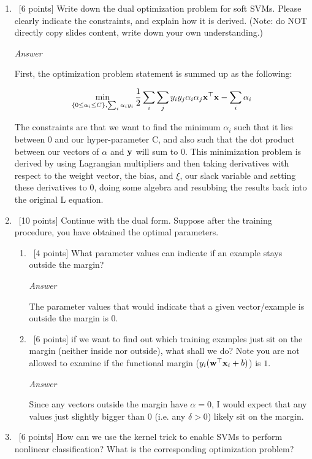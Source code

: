 \documentclass[12pt, fullpage,letterpaper]{article}
\begin{document}
\begin{enumerate}
	
	\item~[6 points] Write down the dual optimization problem for soft SVMs.  
	Please clearly indicate the constraints, and explain how it is derived. (Note: do NOT directly copy slides content, write down your own understanding.)
	
	\emph{Answer}
	
	First, the optimization problem statement is summed up as the following:
	
	\[
	    \min_{\{0 \leq \alpha_i \leq C\}, \sum_i \alpha_i y_i} \frac{1}{2} \sum_i \sum_j y_i y_j \alpha_i \alpha_j {\bf x}^\top {\bf x} - \sum_i \alpha_i
	\]
	
	The constraints are that we want to find the minimum $\alpha_i$ such that it lies between 0 and our hyper-parameter C, and also such that the dot product between our vectors of $\alpha$ and ${\bf y}$ will sum to $0$. This minimization problem is derived by using Lagrangian multipliers and then taking derivatives with respect to the weight vector, the bias, and $\xi$, our slack variable and setting these derivatives to 0, doing some algebra and resubbing the results back into the original L equation.
	
	\item~[10 points] Continue with the dual form. Suppose after the training procedure, you have obtained the optimal parameters.
	\begin{enumerate}
		\item~[4 points] What parameter values can indicate if an example stays outside the margin?
		
		\emph{Answer}
		
		The parameter values that would indicate that a given vector/example is outside the margin is 0.
		
		\item~[6 points]  if we want to find out which training examples just sit on the margin (neither inside nor outside), what shall we do? Note you are not allowed to examine if the functional margin (\ie $y_i({\bf w}^\top{\bf x}_i +b)$) is $1$.
		
		\emph{Answer}
		
		Since any vectors outside the margin have $\alpha=0$, I would expect that any values just slightly bigger than 0 (i.e. any $\delta > 0$) likely sit on the margin.
		
	\end{enumerate}
	
	
	\item~[6 points] How can we use the kernel trick to enable SVMs to perform nonlinear classification? What is the corresponding optimization problem?


\end{enumerate}
\end{document}
